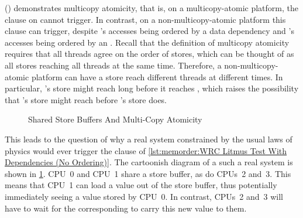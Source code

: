 \begin{fcvref}
()
demonstrates multicopy atomicity, that is, on a multicopy-atomic platform,
the  clause on  cannot trigger.
In contrast, on a non-multicopy-atomic
platform this  clause can trigger, despite
's accesses being ordered by a data dependency and 's
accesses being ordered by an .
Recall that the definition of multicopy atomicity requires that all
threads agree on the order of stores, which can be thought of as
all stores reaching all threads at the same time.
Therefore, a non-multicopy-atomic platform can have a store reach
different threads at different times.
In particular, 's store might reach  long before it
reaches , which raises the possibility that 's store
might reach  before 's store does.
\end{fcvref}

\begin{figure}
\centering
{}
\caption{Shared Store Buffers And Multi-Copy Atomicity}
\label{fig:memorder:Shared Store Buffers And Multi-Copy Atomicity}
\end{figure}

This leads to the question of why a real system constrained by the
usual laws of physics would ever trigger the  clause of
\cref{lst:memorder:WRC Litmus Test With Dependencies (No Ordering)}.
The cartoonish diagram of a such a real system is shown in
\cref{fig:memorder:Shared Store Buffers And Multi-Copy Atomicity}.
CPU~0 and CPU~1 share a store buffer, as do CPUs~2 and~3.
This means that CPU~1 can load a value out of the store buffer, thus
potentially immediately seeing a value stored by CPU~0.
In contrast, CPUs~2 and~3 will have to wait for the corresponding  to carry this new value to them.

